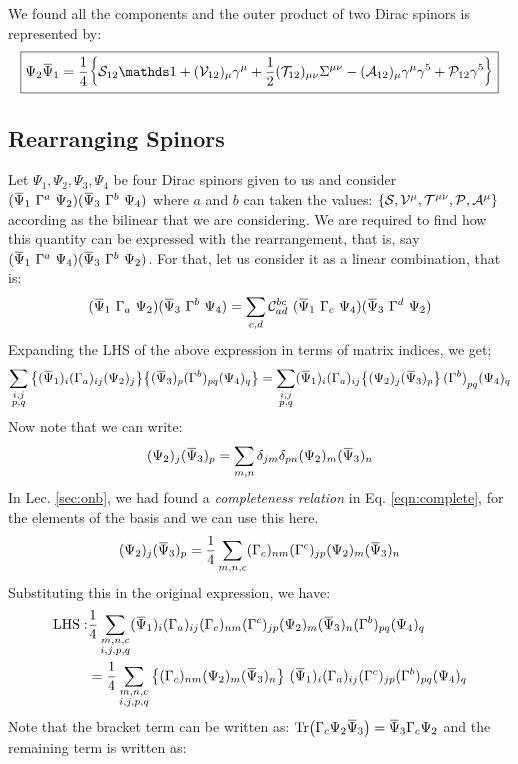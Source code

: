 We found all the components and the outer product of two Dirac spinors is represented by:
$$ \boxed{\Psi_2 \dadj{\Psi}_1 = \frac{1}{4}\qty{\Ss_{12}\iden + (\SV_{12})_{\mu}\gamma^\mu + \frac{1}{2} (\ST_{12})_{\mu\nu}\Sigma^{\mu\nu} - (\SA_{12})_{\mu}\gamma^\mu \gamma^5 + \SP_{12}\gamma^5}}$$
\subsection{Rearranging Spinors}
Let $\Psi_1, \Psi_2, \Psi_3, \Psi_4$ be four Dirac spinors given to us and consider $(\bilin{1}{2}{\Gamma^a})(\bilin{3}{4}{\Gamma^b})$ where $a$ and $b$ can taken the values: $\{\mathcal S, \mathcal V^\mu, \mathcal T^{\mu\nu}, \mathcal P, \mathcal A^\mu \}$ according as the bilinear that we are considering. We are required to find how this quantity can be expressed with the rearrangement, that is, say $(\bilin{1}{4}{\Gamma^a})(\bilin{3}{2}{\Gamma^b})$. For that, let us consider it as a linear combination, that is:
$$(\bilin{1}{2}{\Gamma_a})(\bilin{3}{4}{\Gamma^b}) = \sum_{c,d} \SC^{bc}_{ad}\ (\bilin{1}{4}{\Gamma_c})(\bilin{3}{2}{\Gamma^d})$$
Expanding the LHS of the above expression in terms of matrix indices, we get:
$$\sum\limits_{\substack{i,j\\ p,q}}\qty{(\dadj{\Psi}_1)_i (\Gamma_a)_{ij}(\Psi_2)_j}\qty{(\dadj{\Psi}_3)_p (\Gamma^b)_{pq}(\Psi_4)_q}=\sum\limits_{\substack{i,j\\ p,q}}(\dadj{\Psi}_1)_i (\Gamma_a)_{ij}\qty{(\Psi_2)_j (\dadj{\Psi}_3)_p} (\Gamma^b)_{pq}(\Psi_4)_q$$
Now note that we can write:
$$(\Psi_2)_j (\dadj{\Psi}_3)_p = \sum\limits_{m,n}\delta_{jm}\delta_{pn}(\Psi_2)_m (\dadj{\Psi}_3)_n$$
In Lec. \ref{sec:onb}, we had found a \textit{completeness relation} in Eq. \ref{eqn:complete}, for the elements of the basis and we can use this here. 
$$(\Psi_2)_j (\dadj{\Psi}_3)_p =\frac{1}{4}\sum\limits_{m,n,c} (\Gamma_c)_{nm} (\Gamma^c)_{jp} (\Psi_2)_m (\dadj{\Psi}_3)_n$$
Substituting this in the original expression, we have:
\begin{align*}
    \mathrm{LHS}:& \frac{1}{4}\sum\limits_{\substack{m,n,c\\ i,j,p,q}}(\dadj{\Psi}_1)_i (\Gamma_a)_{ij} (\Gamma_c)_{nm} (\Gamma^c)_{jp} (\Psi_2)_m (\dadj{\Psi}_3)_n (\Gamma^b)_{pq}(\Psi_4)_q\\ &=\frac{1}{4}\sum\limits_{\substack{m,n,c\\ i,j,p,q}} \qty{(\Gamma_c)_{nm} (\Psi_2)_m (\dadj{\Psi}_3)_n} \ (\dadj{\Psi}_1)_i (\Gamma_a)_{ij}(\Gamma^c)_{jp}(\Gamma^b)_{pq}(\Psi_4)_q
\end{align*}
Note that the bracket term can be written as: $\Tr( \Gamma_c \Psi_2 \dadj{\Psi}_3) = \dadj{\Psi}_3 \Gamma_c \Psi_2$ and the remaining term is written as:
